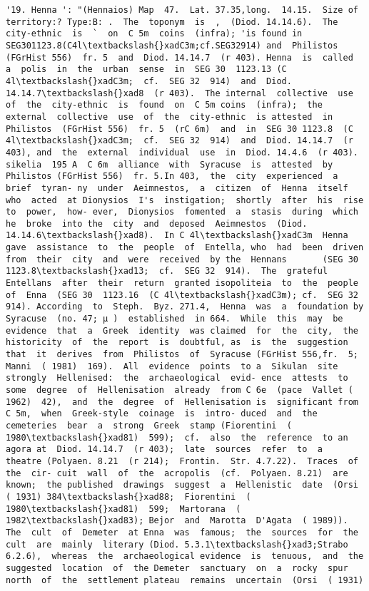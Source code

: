 \documentclass[11pt]{article}
\begin{document}
\begin{Verbatim}[commandchars=\\\{\}]
         '19. Henna ': "(Hennaios) Map  47.  Lat. 37.35,long.  14.15.  Size of  territory:? Type:B: .  The  toponym  is  ,  (Diod. 14.14.6).  The  city-ethnic  is  `  on  C 5m  coins  (infra); 'is found in SEG301123.8(C4l\textbackslash{}xadC3m;cf.SEG32914) and  Philistos  (FGrHist 556)  fr. 5  and  Diod. 14.14.7  (r 403). Henna  is  called  a  polis  in  the  urban  sense  in  SEG 30  1123.13 (C 4l\textbackslash{}xadC3m;  cf.  SEG 32  914)  and  Diod. 14.14.7\textbackslash{}xad8  (r 403).  The internal  collective  use  of  the  city-ethnic  is  found  on  C 5m coins  (infra);  the  external  collective  use  of  the  city-ethnic  is attested  in  Philistos  (FGrHist 556)  fr. 5  (rC 6m)  and  in  SEG 30 1123.8  (C 4l\textbackslash{}xadC3m;  cf.  SEG 32  914)  and  Diod. 14.14.7  (r 403), and  the  external  individual  use  in  Diod. 14.4.6  (r 403). sikelia  195 A  C 6m  alliance  with  Syracuse  is  attested  by  Philistos (FGrHist 556)  fr. 5.In 403,  the  city  experienced  a  brief  tyran- ny  under  Aeimnestos,  a  citizen  of  Henna  itself  who  acted  at Dionysios  I's  instigation;  shortly  after  his  rise  to  power,  how- ever,  Dionysios  fomented  a  stasis  during  which  he  broke  into the  city  and  deposed  Aeimnestos  (Diod. 14.14.6\textbackslash{}xad8).  In C 4l\textbackslash{}xadC3m  Henna  gave  assistance  to  the  people  of  Entella, who  had  been  driven  from  their  city  and  were  received  by the  Hennans       (SEG 30  1123.8\textbackslash{}xad13;  cf.  SEG 32  914).  The  grateful  Entellans  after  their  return  granted isopoliteia  to  the  people  of  Enna  (SEG 30  1123.16  (C 4l\textbackslash{}xadC3m); cf.  SEG 32  914). According  to  Steph.  Byz. 271.4,  Henna  was  a  foundation by  Syracuse  (no. 47; µ )  established  in 664.  While  this  may  be  evidence  that  a  Greek  identity  was claimed  for  the  city,  the  historicity  of  the  report  is  doubtful, as  is  the  suggestion  that  it  derives  from  Philistos  of  Syracuse (FGrHist 556,fr.  5;  Manni  ( 1981)  169).  All  evidence  points  to a  Sikulan  site  strongly  Hellenised:  the  archaeological  evid- ence  attests  to  some  degree  of  Hellenisation  already  from C 6e  (pace  Vallet ( 1962)  42),  and  the  degree  of  Hellenisation is  significant from C 5m,  when  Greek-style  coinage  is  intro- duced  and  the  cemeteries  bear  a  strong  Greek  stamp (Fiorentini  ( 1980\textbackslash{}xad81)  599);  cf.  also  the  reference  to an  agora at  Diod. 14.14.7  (r 403);  late  sources  refer  to  a  theatre (Polyaen. 8.21  (r 214);  Frontin.  Str. 4.7.22).  Traces  of  the  cir- cuit  wall  of  the  acropolis  (cf.  Polyaen. 8.21)  are  known;  the published  drawings  suggest  a  Hellenistic  date  (Orsi  ( 1931) 384\textbackslash{}xad88;  Fiorentini  ( 1980\textbackslash{}xad81)  599;  Martorana  ( 1982\textbackslash{}xad83); Bejor  and  Marotta  D'Agata  ( 1989)).  The  cult  of  Demeter  at Enna  was  famous;  the  sources  for  the  cult  are  mainly  literary (Diod. 5.3.1\textbackslash{}xad3;Strabo 6.2.6),  whereas  the  archaeological evidence  is  tenuous,  and  the  suggested  location  of  the Demeter  sanctuary  on  a  rocky  spur  north  of  the  settlement plateau  remains  uncertain  (Orsi  ( 1931)  
\end{Verbatim}
\end{document}
